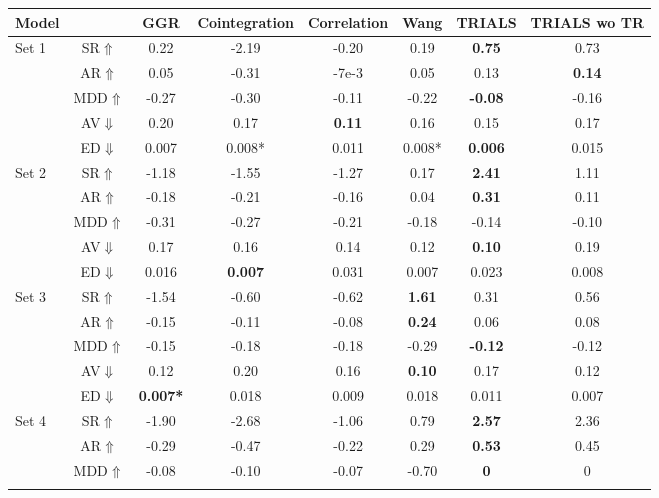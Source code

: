 \documentclass[sigconf]{acmart}
\begin{document}
\begin{table*}[htp]
\centering
\small
\begin{tabular}{@{}l||c|c|c|c|c||c|c@{}}
\toprule
Model &  & GGR & Cointegration & Correlation & Wang &  TRIALS & TRIALS wo TR \\ \midrule
\multirow{5}{*}{Set 1} & SR$\Uparrow$ & 0.22 & -2.19 & -0.20 & 0.19 & \textbf{0.75} & 0.73  \\\cmidrule{2-8}
 & AR$\Uparrow$ & 0.05 & -0.31 & -7e-3 & 0.05 & 0.13 & \textbf{0.14}  \\\cmidrule{2-8}
 & MDD$\Uparrow$ & -0.27 & -0.30 & -0.11 & -0.22 & \textbf{-0.08} & -0.16  \\\cmidrule{2-8}
 & AV$\Downarrow$ & 0.20 & 0.17 & \textbf{0.11} & 0.16 & 0.15 & 0.17 \\\cmidrule{2-8}
 & ED$\Downarrow$ & 0.007 & 0.008* & 0.011 & 0.008* & \textbf{0.006} & 0.015 \\ \midrule \midrule
\multirow{5}{*}{Set 2} & SR$\Uparrow$ & -1.18 & -1.55 & -1.27 & 0.17 & \textbf{2.41} & 1.11  \\\cmidrule{2-8}
 & AR$\Uparrow$ & -0.18 & -0.21 & -0.16 & 0.04 & \textbf{0.31} & 0.11 \\\cmidrule{2-8}
 & MDD$\Uparrow$ & -0.31 & -0.27 & -0.21 & -0.18 & -0.14 & -0.10 \\\cmidrule{2-8}
 & AV$\Downarrow$ & 0.17 & 0.16 & 0.14 & 0.12 & \textbf{0.10} & 0.19  \\\cmidrule{2-8}
 & ED$\Downarrow$ & 0.016 & \textbf{0.007} & 0.031 & 0.007 & 0.023 & 0.008  \\\midrule
\multirow{5}{*}{Set 3} & SR$\Uparrow$ & -1.54 & -0.60 & -0.62 & \textbf{1.61} & 0.31 & 0.56 \\\cmidrule{2-8}
 & AR$\Uparrow$ & -0.15 & -0.11 & -0.08 & \textbf{0.24} & 0.06 & 0.08 \\\cmidrule{2-8}
 & MDD$\Uparrow$ & -0.15 & -0.18 & -0.18 & -0.29 & \textbf{-0.12} & -0.12 \\\cmidrule{2-8}
 & AV$\Downarrow$ & 0.12 & 0.20 & 0.16 & \textbf{0.10} & 0.17 & 0.12 \\\cmidrule{2-8}
 & ED$\Downarrow$ & \textbf{0.007*} & 0.018 & 0.009 & 0.018 & 0.011 & 0.007 \\\midrule
\multirow{5}{*}{Set 4} & SR$\Uparrow$ & -1.90 & -2.68 & -1.06 & 0.79 & \textbf{2.57} & 2.36\\\cmidrule{2-8}
 & AR$\Uparrow$ & -0.29 & -0.47 & -0.22 & 0.29 & \textbf{0.53} & 0.45 \\\cmidrule{2-8}
 & MDD$\Uparrow$ & -0.08 & -0.10 & -0.07 & -0.70 & \textbf{0} & 0  \\\cmidrule{2-8}

\end{tabular}
\end{table*}
\end{document}
